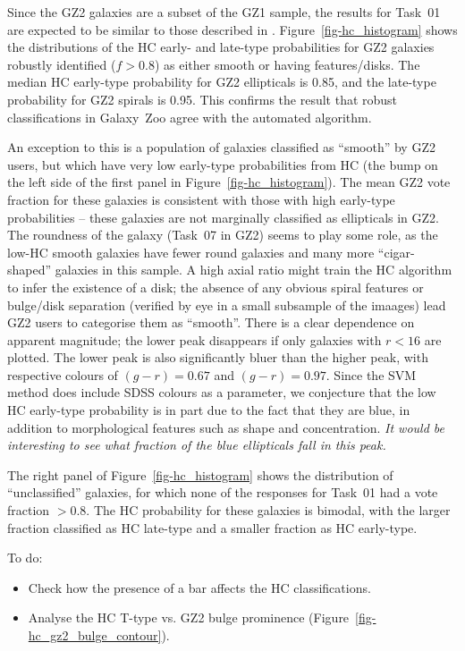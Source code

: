 \documentclass[useAMS,usenatbib]{mn2e}
\begin{document}
Since the GZ2 galaxies are a subset of the GZ1 sample, the results for Task~01 are expected to be similar to those described in \citet{hue11}. Figure~\ref{fig-hc_histogram} shows the distributions of the HC early- and late-type probabilities for GZ2 galaxies robustly identified ($f>0.8$) as either smooth or having features/disks. The median HC early-type probability for GZ2 ellipticals is 0.85, and the late-type probability for GZ2 spirals is 0.95. This confirms the result that robust classifications in Galaxy~Zoo agree with the automated algorithm. 

An exception to this is a population of galaxies classified as ``smooth'' by GZ2 users, but which have very low early-type probabilities from HC (the bump on the left side of the first panel in Figure~\ref{fig-hc_histogram}). The mean GZ2 vote fraction for these galaxies is consistent with those with high early-type probabilities -- these galaxies are not marginally classified as ellipticals in GZ2. The roundness of the galaxy (Task~07 in GZ2) seems to play some role, as the low-HC smooth galaxies have fewer round galaxies and many more ``cigar-shaped'' galaxies in this sample. A high axial ratio might train the HC algorithm to infer the existence of a disk; the absence of any obvious spiral features or bulge/disk separation (verified by eye in a small subsample of the imaages) lead GZ2 users to categorise them as ``smooth''. There is a clear dependence on apparent magnitude; the lower peak disappears if only galaxies with $r<16$ are plotted. The lower peak is also significantly bluer than the higher peak, with respective colours of $(g-r)=0.67$ and $(g-r)=0.97$. Since the SVM method does include SDSS colours as a parameter, we conjecture that the low HC early-type probability is in part due to the fact that they are blue, in addition to morphological features such as shape and concentration. {\em It would be interesting to see what fraction of the blue ellipticals \citep{sch09} fall in this peak.}

The right panel of Figure~\ref{fig-hc_histogram} shows the distribution of ``unclassified'' galaxies, for which none of the responses for Task~01 had a vote fraction $>0.8$. The HC probability for these galaxies is bimodal, with the larger fraction classified as HC late-type and a smaller fraction as HC early-type. 

To do:
\begin{itemize}
	\item Check how the presence of a bar affects the HC classifications.
	\item Analyse the HC T-type vs. GZ2 bulge prominence (Figure~\ref{fig-hc_gz2_bulge_contour}).
\end{itemize}
\end{document}
